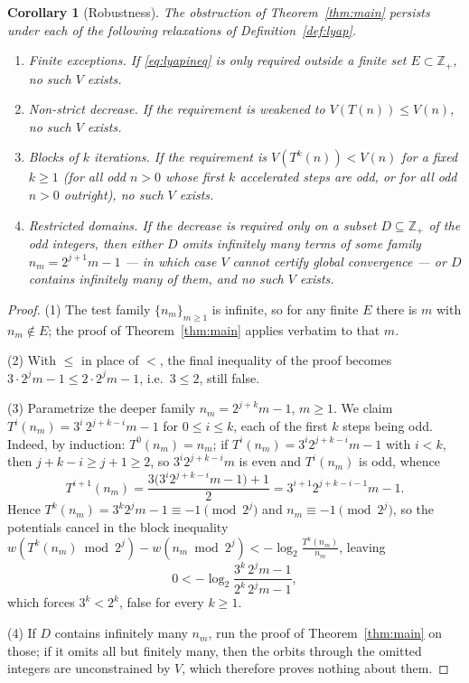 \documentclass[11pt]{amsart}
\newtheorem{corollary}[theorem]{Corollary}
\theoremstyle{definition}
\theoremstyle{remark}
\newcommand{\Z}{\mathbb{Z}}
\begin{document}
\begin{corollary}[Robustness]\label{cor:robust}
The obstruction of Theorem~\ref{thm:main} persists under each of the following relaxations of Definition~\ref{def:lyap}.
\begin{enumerate}
\item \emph{Finite exceptions.} If \eqref{eq:lyapineq} is only required outside a finite set $E \subset \Z_+$, no such $V$ exists.
\item \emph{Non-strict decrease.} If the requirement is weakened to $V(T(n)) \le V(n)$, no such $V$ exists.
\item \emph{Blocks of $k$ iterations.} If the requirement is $V(T^k(n)) < V(n)$ for a fixed $k \ge 1$ (for all odd $n > 0$ whose first $k$ accelerated steps are odd, or for all odd $n>0$ outright), no such $V$ exists.
\item \emph{Restricted domains.} If the decrease is required only on a subset $D \subseteq \Z_+$ of the odd integers, then either $D$ omits infinitely many terms of some family $n_m = 2^{j+1}m-1$ --- in which case $V$ cannot certify global convergence --- or $D$ contains infinitely many of them, and no such $V$ exists.
\end{enumerate}
\end{corollary}

\begin{proof}
(1) The test family $\{n_m\}_{m \ge 1}$ is infinite, so for any finite $E$ there is $m$ with $n_m \notin E$; the proof of Theorem~\ref{thm:main} applies verbatim to that $m$.

(2) With $\le$ in place of $<$, the final inequality of the proof becomes $3\cdot 2^j m - 1 \le 2\cdot 2^j m - 1$, i.e.\ $3 \le 2$, still false.

(3) Parametrize the deeper family $n_m = 2^{j+k}m - 1$, $m\ge1$. We claim $T^i(n_m) = 3^i\, 2^{j+k-i} m - 1$ for $0 \le i \le k$, each of the first $k$ steps being odd. Indeed, by induction: $T^0(n_m) = n_m$; if $T^i(n_m) = 3^i 2^{j+k-i}m - 1$ with $i < k$, then $j + k - i \ge j + 1 \ge 2$, so $3^i 2^{j+k-i}m$ is even and $T^i(n_m)$ is odd, whence
\[
T^{i+1}(n_m) = \frac{3\bigl(3^i 2^{j+k-i}m - 1\bigr)+1}{2} = 3^{i+1} 2^{j+k-i-1} m - 1 .
\]
Hence $T^k(n_m) = 3^k 2^j m - 1 \equiv -1 \pmod{2^j}$ and $n_m \equiv -1 \pmod{2^j}$, so the potentials cancel in the block inequality $w(T^k(n_m) \bmod 2^j) - w(n_m \bmod 2^j) < -\log_2 \frac{T^k(n_m)}{n_m}$, leaving
\[
0 < -\log_2 \frac{3^k\, 2^j m - 1}{2^k\, 2^j m - 1},
\]
which forces $3^k < 2^k$, false for every $k \ge 1$.

(4) If $D$ contains infinitely many $n_m$, run the proof of Theorem~\ref{thm:main} on those; if it omits all but finitely many, then the orbits through the omitted integers are unconstrained by $V$, which therefore proves nothing about them.
\end{proof}
\end{document}
